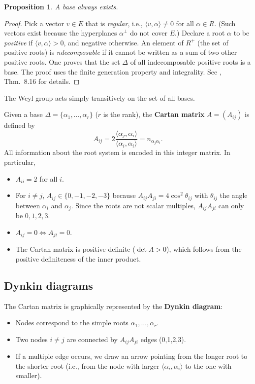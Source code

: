 \documentclass{article}
\newtheorem{proposition}[theorem]{Proposition}
\theoremstyle{definition}
\theoremstyle{remark}
\newcommand{\D}{\Delta}
\begin{document}
\begin{proposition}
A base always exists.
\end{proposition}
\begin{proof}
Pick a vector $v\in E$ that is \emph{regular}, i.e., $\langle v,\alpha\rangle \neq 0$
for all $\alpha\in R$. (Such vectors exist because the hyperplanes $\alpha^\perp$ do
not cover $E$.) Declare a root $\alpha$ to be \emph{positive} if $\langle v,\alpha\rangle > 0$,
and negative otherwise. An element of $R^+$ (the set of positive roots) is
\emph{ndecomposable} if it cannot be written as a sum of two other positive roots.
One proves that the set $\D$ of all indecomposable positive roots is a base.
The proof uses the finite generation property and integrality. See \cite{Hall}, Thm.~8.16
for details.
\end{proof}

The Weyl group acts simply transitively on the set of all bases.

Given a base $\D = \{\alpha_1,\dots,\alpha_r\}$ ($r$ is the rank), the
\textbf{Cartan matrix} $A = (A_{ij})$ is defined by
\[
A_{ij} = 2\frac{\langle\alpha_j,\alpha_i\rangle}{\langle\alpha_i,\alpha_i\rangle}
= n_{\alpha_j\alpha_i}.
\]
All information about the root system is encoded in this integer matrix. In particular,
\begin{itemize}
  \item $A_{ii} = 2$ for all $i$.
  \item For $i\neq j$, $A_{ij} \in \{0,-1,-2,-3\}$ because $A_{ij}A_{ji} = 4\cos^2\theta_{ij}$
    with $\theta_{ij}$ the angle between $\alpha_i$ and $\alpha_j$. Since the roots are
    not scalar multiples, $A_{ij}A_{ji}$ can only be $0,1,2,3$.
  \item $A_{ij}=0 \iff A_{ji}=0$.
  \item The Cartan matrix is positive definite ($\det A >0$), which follows from the
    positive definiteness of the inner product.
\end{itemize}

\subsection{Dynkin diagrams}
The Cartan matrix is graphically represented by the \textbf{Dynkin diagram}:
\begin{itemize}
  \item Nodes correspond to the simple roots $\alpha_1,\dots,\alpha_r$.
  \item Two nodes $i\neq j$ are connected by $A_{ij}A_{ji}$ edges (0,1,2,3).
  \item If a multiple edge occurs, we draw an arrow pointing from the longer root
    to the shorter root (i.e., from the node with larger $\langle\alpha_i,\alpha_i\rangle$
    to the one with smaller).
\end{itemize}
\end{document}
